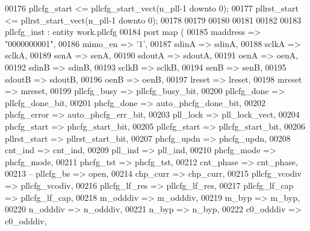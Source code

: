 \begin{DoxyCode}
00176 \textcolor{vhdlchar}{pllcfg_start} \textcolor{vhdlchar}{<=} \textcolor{vhdlchar}{pllcfg_start_vect}\textcolor{vhdlchar}{(}\textcolor{vhdlchar}{n_pll}\textcolor{vhdlchar}{-}\textcolor{vhdllogic}{}\textcolor{vhdllogic}{1} \textcolor{keywordflow}{downto} \textcolor{vhdllogic}{}\textcolor{vhdllogic}{0}\textcolor{vhdlchar}{)};
00177 \textcolor{vhdlchar}{pllrst_start} \textcolor{vhdlchar}{<=} \textcolor{vhdlchar}{pllrst_start_vect}\textcolor{vhdlchar}{(}\textcolor{vhdlchar}{n_pll}\textcolor{vhdlchar}{-}\textcolor{vhdllogic}{}\textcolor{vhdllogic}{1} \textcolor{keywordflow}{downto} \textcolor{vhdllogic}{}\textcolor{vhdllogic}{0}\textcolor{vhdlchar}{)};
00178 
00179 
00180 
00181 
00182 
00183 pllcfg\_inst : \textcolor{keywordflow}{entity} work.pllcfg
00184 \textcolor{keywordflow}{port} \textcolor{keywordflow}{map} (
00185         maddress            => "\textcolor{vhdllogic}{0000000001}",
00186         mimo_en         => '1',
00187         sdinA               => sdinA,
00188         sclkA               => sclkA,
00189         senA                => senA,
00190         sdoutA          => sdoutA,
00191         oenA                => oenA,
00192         sdinB               => sdinB,
00193         sclkB               => sclkB,
00194         senB                => senB,
00195         sdoutB          => sdoutB,
00196         oenB                => oenB,
00197         lreset          => lreset,
00198         mreset          => mreset,
00199         pllcfg_busy     => pllcfg_busy_bit,
00200         pllcfg_done     => pllcfg_done_bit,
00201       phcfg_done     => auto_phcfg_done_bit,
00202       phcfg_error    => auto_phcfg_err_bit,
00203         pll_lock            => pll_lock_vect,
00204         phcfg_start     => phcfg_start_bit,
00205         pllcfg_start    => pllcfg_start_bit,
00206         pllrst_start    => pllrst_start_bit,
00207         phcfg_updn      => phcfg_updn,
00208         cnt_ind         => cnt_ind,
00209         pll_ind         => pll_ind,
00210       phcfg_mode     => phcfg_mode,
00211       phcfg_tst      => phcfg_tst, 
00212         cnt_phase       => cnt_phase,       
00213 \textcolor{keyword}{--      pllcfg\_bs       => open, }
00214         chp_curr            => chp_curr, 
00215         pllcfg_vcodiv   => pllcfg_vcodiv,
00216         pllcfg_lf_res   => pllcfg_lf_res,
00217         pllcfg_lf_cap   => pllcfg_lf_cap,   
00218         m_odddiv            => m_odddiv,
00219         m_byp               => m_byp,
00220         n_odddiv            => n_odddiv,
00221         n_byp               => n_byp,
00222         c0_odddiv       => c0_odddiv,

\end{DoxyCode}
